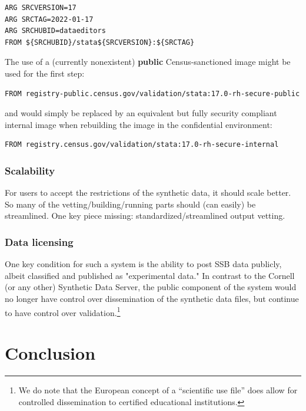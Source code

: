 \documentclass[]{hdsr}
\begin{document}
\begin{lstlisting}[language=docker]
ARG SRCVERSION=17
ARG SRCTAG=2022-01-17
ARG SRCHUBID=dataeditors
FROM ${SRCHUBID}/stata${SRCVERSION}:${SRCTAG}
\end{lstlisting}

The use of a  (currently nonexistent) \textbf{public}  Census-sanctioned image might be used for the first step:

\begin{lstlisting}[language=docker]
FROM registry-public.census.gov/validation/stata:17.0-rh-secure-public
\end{lstlisting}

and would simply be replaced by an equivalent but fully security compliant internal image when rebuilding the image in the confidential environment:

\begin{lstlisting}[language=docker]
FROM registry.census.gov/validation/stata:17.0-rh-secure-internal
\end{lstlisting}



\subsubsection{Scalability}

For users to accept the restrictions of the synthetic data, it should scale better. So many of the vetting/building/running parts should (can easily) be streamlined. One key piece missing: standardized/streamlined output vetting.

\subsubsection{Data licensing}

One key condition for such a system is the ability to post SSB data publicly, albeit  classified and published as "experimental data." In contrast to the Cornell (or any other) Synthetic Data Server, the public component of the system would no longer have control over dissemination of the synthetic data files, but continue to have control over validation.\footnote{We do note that the European concept of a ``scientific use file'' does allow for controlled dissemination to certified educational institutions.}

\section{Conclusion}
\end{document}
